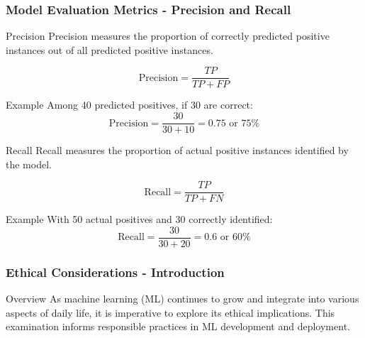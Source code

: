 \documentclass[aspectratio=169]{beamer}
\begin{document}
\begin{frame}[fragile]
    \frametitle{Model Evaluation Metrics - Precision and Recall}
    \begin{block}{Precision}
        Precision measures the proportion of correctly predicted positive instances out of all predicted positive instances.
    \end{block}
    
    \begin{equation}
        \text{Precision} = \frac{TP}{TP + FP}
    \end{equation}
    
    \begin{block}{Example}
        Among 40 predicted positives, if 30 are correct:
        \[
        \text{Precision} = \frac{30}{30 + 10} = 0.75 \text{ or } 75\%
        \]
    \end{block}

    \begin{block}{Recall}
        Recall measures the proportion of actual positive instances identified by the model.
    \end{block}
    
    \begin{equation}
        \text{Recall} = \frac{TP}{TP + FN}
    \end{equation}
    
    \begin{block}{Example}
        With 50 actual positives and 30 correctly identified:
        \[
        \text{Recall} = \frac{30}{30 + 20} = 0.6 \text{ or } 60\%
        \]
    \end{block}
\end{frame}

\begin{frame}[fragile]
    \frametitle{Ethical Considerations - Introduction}
    \begin{block}{Overview}
        As machine learning (ML) continues to grow and integrate into various aspects of daily life, it is imperative to explore its ethical implications. This examination informs responsible practices in ML development and deployment.
    \end{block}
\end{frame}
\end{document}
